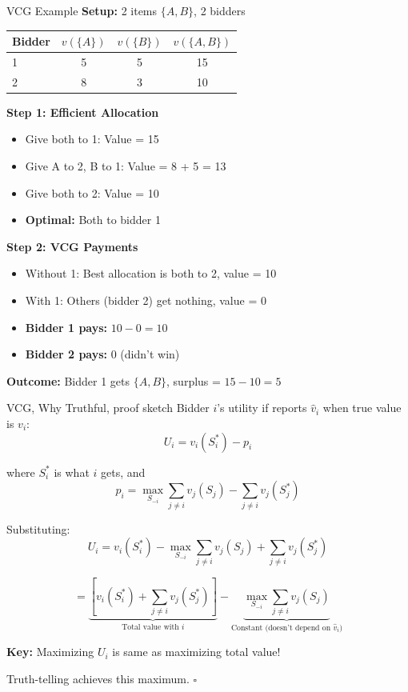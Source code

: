 \documentclass[xcolor={x11names}, aspectratio=169 ]{beamer}
\begin{document}
\begin{frame}{VCG Example}
\textbf{Setup:} 2 items $\{A, B\}$, 2 bidders

\begin{center}
\begin{tabular}{l|cc|c}
\toprule
Bidder & $v(\{A\})$ & $v(\{B\})$ & $v(\{A,B\})$ \\
\midrule
1 & 5 & 5 & 15 \\
2 & 8 & 3 & 10 \\
\bottomrule
\end{tabular}
\end{center}

\textbf{Step 1: Efficient Allocation}
\begin{itemize}
  \item Give both to 1: Value = 15
  \item Give A to 2, B to 1: Value = 8 + 5 = 13
  \item Give both to 2: Value = 10
  \item \textbf{Optimal:} Both to bidder 1
\end{itemize}

\textbf{Step 2: VCG Payments}
\begin{itemize}
  \item Without 1: Best allocation is both to 2, value = 10
  \item With 1: Others (bidder 2) get nothing, value = 0
  \item \textbf{Bidder 1 pays:} $10 - 0 = 10$
  \item \textbf{Bidder 2 pays:} 0 (didn't win)
\end{itemize}

\textbf{Outcome:} Bidder 1 gets $\{A,B\}$, surplus = $15 - 10 = 5$
\end{frame}

\begin{frame}{VCG, Why Truthful, proof sketch}
Bidder $i$'s utility if reports $\hat{v}_i$ when true value is $v_i$:
$$U_i = v_i(S_i^*) - p_i$$

where $S_i^*$ is what $i$ gets, and
$$p_i = \max_{S_{-i}} \sum_{j \neq i} v_j(S_j) - \sum_{j \neq i} v_j(S_j^*)$$

Substituting:
$$U_i = v_i(S_i^*) - \max_{S_{-i}} \sum_{j \neq i} v_j(S_j) + \sum_{j \neq i} v_j(S_j^*)$$

$$= \underbrace{\left[v_i(S_i^*) + \sum_{j \neq i} v_j(S_j^*)\right]}_{\text{Total value with } i} - \underbrace{\max_{S_{-i}} \sum_{j \neq i} v_j(S_j)}_{\text{Constant (doesn't depend on } \hat{v}_i)}$$

\textbf{Key:} Maximizing $U_i$ is same as maximizing total value!

Truth-telling achieves this maximum. $\square$
\end{frame}
\end{document}
